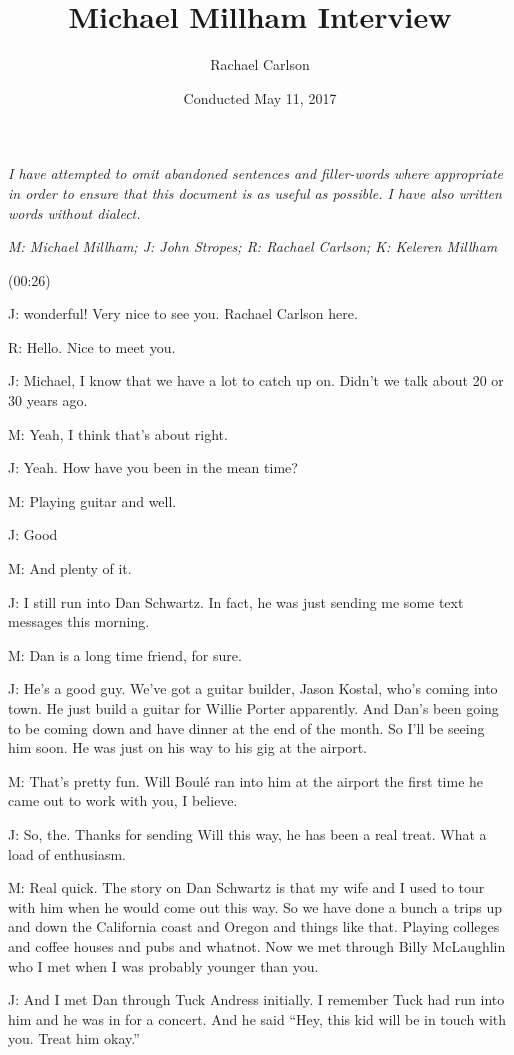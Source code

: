 \documentclass[11pt]{article}
\author{Rachael Carlson}
\date{Conducted May 11, 2017}
\title{Michael Millham Interview}
\begin{document}
\maketitle
\flushleft

\emph{I have attempted to omit abandoned sentences and filler-words where appropriate in order to ensure that this document is as useful as possible. I have also written words without dialect.}

\emph{M: Michael Millham; J: John Stropes; R: Rachael Carlson; K: Keleren Millham}

(00:26)

J: wonderful! Very nice to see you. Rachael Carlson here.

R: Hello. Nice to meet you.

J: Michael, I know that we have a lot to catch up on. Didn't we talk about 20 or 30 years ago. 

M: Yeah, I think that's about right.

J: Yeah. How have you been in the mean time?

M: Playing guitar and well.

J: Good

M: And plenty of it.

J: I still run into Dan Schwartz. In fact, he was just sending me some text messages this morning.

M: Dan is a long time friend, for sure.  

J: He's a good guy. We've got a guitar builder, Jason Kostal, who's coming into town. He just build a guitar for Willie Porter apparently. And Dan's been going to be coming down and have dinner at the end of the month. So I'll be seeing him soon. He was just on his way to his gig at the airport.

M: That's pretty fun. Will Boulé ran into him at the airport the first time he came out to work with you, I believe.

J: So, the. Thanks for sending Will this way, he has been a real treat. What a load of enthusiasm.

M: Real quick. The story on Dan Schwartz is that my wife and I used to tour with him when he would come out this way. So we have done a bunch a trips up and down the California coast and Oregon and things like that. Playing colleges and coffee houses and pubs and whatnot. Now we met through Billy McLaughlin who I met when I was probably younger than you. 

J: And I met Dan through Tuck Andress initially. I remember Tuck had run into him and he was in for a concert. And he said ``Hey, this kid will be in touch with you. Treat him okay.''
\end{document}
